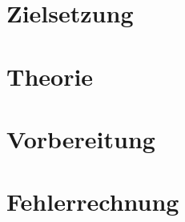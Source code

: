 %

%
\section{Zielsetzung}
\label{sec:Theorie}

\section{Theorie}

\section{Vorbereitung}

\section{Fehlerrechnung}
%
